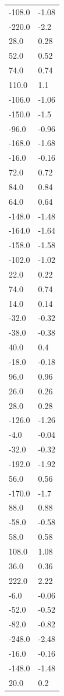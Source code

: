 \begin{longtable}{ll}
-108.0 & -1.08 \\
-220.0 & -2.2 \\
28.0 & 0.28 \\
52.0 & 0.52 \\
74.0 & 0.74 \\
110.0 & 1.1 \\
-106.0 & -1.06 \\
-150.0 & -1.5 \\
-96.0 & -0.96 \\
-168.0 & -1.68 \\
-16.0 & -0.16 \\
72.0 & 0.72 \\
84.0 & 0.84 \\
64.0 & 0.64 \\
-148.0 & -1.48 \\
-164.0 & -1.64 \\
-158.0 & -1.58 \\
-102.0 & -1.02 \\
22.0 & 0.22 \\
74.0 & 0.74 \\
14.0 & 0.14 \\
-32.0 & -0.32 \\
-38.0 & -0.38 \\
40.0 & 0.4 \\
-18.0 & -0.18 \\
96.0 & 0.96 \\
26.0 & 0.26 \\
28.0 & 0.28 \\
-126.0 & -1.26 \\
-4.0 & -0.04 \\
-32.0 & -0.32 \\
-192.0 & -1.92 \\
56.0 & 0.56 \\
-170.0 & -1.7 \\
88.0 & 0.88 \\
-58.0 & -0.58 \\
58.0 & 0.58 \\
108.0 & 1.08 \\
36.0 & 0.36 \\
222.0 & 2.22 \\
-6.0 & -0.06 \\
-52.0 & -0.52 \\
-82.0 & -0.82 \\
-248.0 & -2.48 \\
-16.0 & -0.16 \\
-148.0 & -1.48 \\
20.0 & 0.2 \\

\end{longtable}
